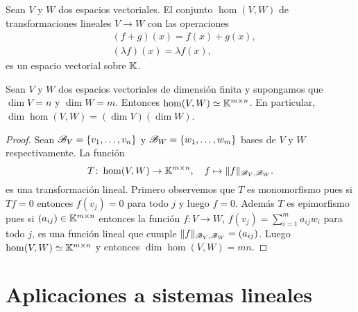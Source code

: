 \begin{block}
	Sean $V$ y $W$ dos espacios vectoriales. El conjunto $\hom(V,W)$ de
	transformaciones lineales $V\to W$ con las operaciones 
    \begin{align*}
        & (f+g)(x)=f(x)+g(x),\\
        & (\lambda f)(x)=\lambda f(x),
    \end{align*}
    es un espacio vectorial sobre $\mathbb{K}$. 
\end{block}

\begin{prop}
    \label{pro:hom(V,W)}
    Sean $V$ y $W$ dos espacios vectoriales de dimensión finita y supongamos
    que $\dim V=n$ y $\dim W=m$. Entonces $\hom(V,W)\simeq\mathbb{K}^{m\times n}$. En
    particular, $\dim\hom(V,W)=(\dim V)(\dim W)$.

    \begin{proof}
        Sean $\mathscr{B}_V=\{v_1,\dots,v_n\}$ y $\mathscr{B}_W=\{w_1,\dots,w_m\}$ bases de $V$
        y $W$ respectivamente.  La función
        \[
            T\colon\hom(V,W)\to\mathbb{K}^{m\times n},\quad f\mapsto\|f\|_{\mathscr{B}_V,\mathscr{B}_W}.
        \]
		es una transformación lineal.  Primero observemos que $T$ es
		monomorfismo pues si $Tf=0$ entonces $f(v_j)=0$ para todo $j$ y luego
		$f=0$. Además $T$ es epimorfismo pues si $(a_{ij})\in\mathbb{K}^{m\times n}$
		entonces la función $f\colon V\to W$, $f(v_j)=\sum_{i=1}^ma_{ij}w_i$
		para todo $j$, es una función lineal que cumple
		$\|f\|_{\mathscr{B}_V,\mathscr{B}_W}=(a_{ij})$.    Luego $\hom(V,W)\simeq\mathbb{K}^{m\times
		n}$ y entonces $\dim\hom(V,W)=mn$.
    \end{proof}
\end{prop}

\section{Aplicaciones a sistemas lineales}

